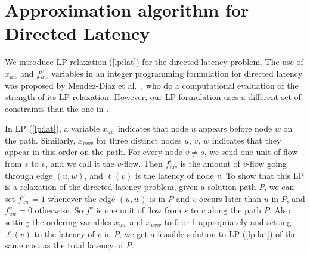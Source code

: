 \documentclass[11pt]{article}
\begin{document}
\section{Approximation algorithm for Directed Latency} \label{sec:latency}
We introduce LP relaxation (\ref{lp:lat}) for the directed latency problem.
The use of $x_{uw}$ and $f^v_{uw}$ variables in an integer programming formulation for directed latency was proposed by Mendez-Diaz et al.\ \cite{mendez-diaz}, who do a computational evaluation of the strength of its LP relaxation. However, our LP formulation uses a different set of constraints than the one in \cite{mendez-diaz}.

In LP (\ref{lp:lat}), a variable $x_{uw}$ indicates
that node $u$ appears before node $w$ on the path. Similarly, $x_{uvw}$ for three distinct nodes $u$, $v$, $w$ indicates that they appear in this order on the path. For every node $v\neq s$,
we send one unit of flow from $s$ to $v$, and we call it the $v$-flow. 
Then $f^v_{uw}$ is the amount of $v$-flow going through edge $(u,w)$, and $\ell(v)$ is the latency of node $v$.
To show that this LP is a relaxation of the directed latency problem, given a solution path $P$, 
we can set $f^v_{uw}=1$ whenever the edge $(u,w)$ is in $P$ and $v$ occurs later than $u$ in $P$, 
and $f^v_{uw}=0$ otherwise. So $f^v$ is one unit of flow from $s$ to $v$ along the path $P$.
Also setting the ordering variables $x_{uw}$ and $x_{uvw}$ to 0 or 1 appropriately and setting $\ell(v)$ to the latency of $v$ in $P$, we get a feasible solution to LP (\ref{lp:lat}) of the same cost as the total latency of $P$.
\end{document}
